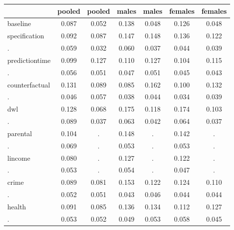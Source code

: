 \begin{table}[htbp]
\begin{tabular}{lcccccc} \hline \hline
 & pooled  & pooled  & males  & males  & females  & females  \\  \hline 
baseline &     0.087 &     0.052 &     0.138 &     0.048 &     0.126 &     0.048 \\  
specification &     0.092 &     0.087 &     0.147 &     0.148 &     0.136 &     0.122 \\  
. &     0.059 &     0.032 &     0.060 &     0.037 &     0.044 &     0.039 \\  
predictiontime &     0.099 &     0.127 &     0.110 &     0.127 &     0.104 &     0.115 \\  
. &     0.056 &     0.051 &     0.047 &     0.051 &     0.045 &     0.043 \\  
counterfactual &     0.131 &     0.089 &     0.085 &     0.162 &     0.100 &     0.132 \\  
. &     0.046 &     0.057 &     0.038 &     0.044 &     0.034 &     0.039 \\  
dwl &     0.128 &     0.068 &     0.175 &     0.118 &     0.174 &     0.103 \\  
. &     0.089 &     0.037 &     0.063 &     0.042 &     0.064 &     0.037 \\  
parental &     0.104 &         . &     0.148 &         . &     0.142 &         . \\  
. &     0.069 &         . &     0.053 &         . &     0.053 &         . \\  
lincome &     0.080 &         . &     0.127 &         . &     0.122 &         . \\  
. &     0.053 &         . &     0.054 &         . &     0.047 &         . \\  
crime &     0.089 &     0.081 &     0.153 &     0.122 &     0.124 &     0.110 \\  
. &     0.052 &     0.051 &     0.043 &     0.046 &     0.044 &     0.044 \\  
health &     0.091 &     0.085 &     0.136 &     0.134 &     0.112 &     0.127 \\  
. &     0.053 &     0.052 &     0.049 &     0.053 &     0.058 &     0.045 \\  
\hline \hline \end{tabular}
\end{table}
